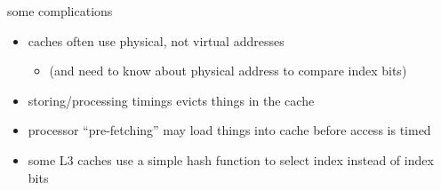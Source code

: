 \begin{frame}{some complications}
    \begin{itemize}
    \item caches often use physical, not virtual addresses
        \begin{itemize}
        \item (and need to know about physical address to compare index bits)
        \end{itemize}
    \item storing/processing timings evicts things in the cache
    \item processor ``pre-fetching'' may load things into cache before access is timed
    \item some L3 caches use a simple hash function to select index instead of  index bits
    \end{itemize}
\end{frame}

